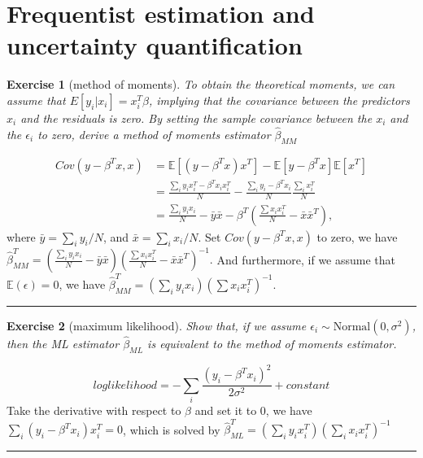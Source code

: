 \documentclass[twoside]{article}
\newcounter{lecnum}
\newtheorem{exercise}{Exercise}[lecnum]
\newenvironment{proof}{{\bf Proof:}}{\hfill\rule{2mm}{2mm}}
\newcommand\E{\mathbb{E}}
\begin{document}
  

\section{Frequentist estimation and uncertainty quantification}

\begin{exercise}[method of moments]
  To obtain the theoretical moments, we can assume that $E[y_i|x_i] = x_i^T\beta$, implying that the covariance between the predictors $x_i$ and the residuals is zero. By setting the sample covariance between the $x_i$ and the $\epsilon_i$ to zero, derive a method of moments estimator $\hat{\beta}_{MM}$
\end{exercise}
\begin{proof}
\begin{equation}
\begin{split}
Cov(y-\beta^Tx, x) &= \E[(y-\beta^Tx)x^T]-\E[y-\beta^Tx]\E[x^T]\\
& = \frac{\sum_iy_ix_i^T - \beta^Tx_ix_i^T}{N}-\frac{\sum_iy_i-\beta^Tx_i}{N}\frac{\sum_ix_i^T}{N}\\
& = \frac{\sum_iy_ix_i}{N}-\bar{y}\bar{x} - \beta^T(\frac{\sum x_ix_i^T}{N}-\bar{x}\bar{x}^T),
\end{split}
\end{equation}
where $\bar{y} = \sum_i y_i/N$, and $\bar{x} = \sum_i x_i/N.$
Set $Cov(y-\beta^Tx,x)$ to zero, we have $\hat{\beta}_{MM}^T= (\frac{\sum_iy_ix_i}{N}-\bar{y}\bar{x})(\frac{\sum x_ix_i^T}{N}-\bar{x}\bar{x}^T)^{-1}.$ And furthermore, if we assume that $\E(\epsilon) = 0$, we have $\hat{\beta}_{MM}^T= ({\sum_iy_ix_i})({\sum x_ix_i^T})^{-1}.$
\end{proof}
\begin{exercise}[maximum likelihood]
  Show that, if we assume $\epsilon_i\sim \mbox{Normal}(0,\sigma^2)$, then the ML estimator $\hat{\beta}_{ML}$ is equivalent to the method of moments estimator.
\end{exercise}

\begin{proof}
\begin{equation}loglikelihood = -\sum_i \frac{(y_i-\beta^Tx_i)^2}{2\sigma^2} + constant\label{likelihood}
\end{equation}
Take the derivative with respect to $\beta$ and set it to $0$, we have $\sum_i(y_i-\beta^Tx_i)x_i^T = 0$, which is solved by $\hat{\beta}_{ML}^T = (\sum_i y_ix_i^T)(\sum_i x_ix_i^T)^{-1}$
\end{proof}
\end{document}
